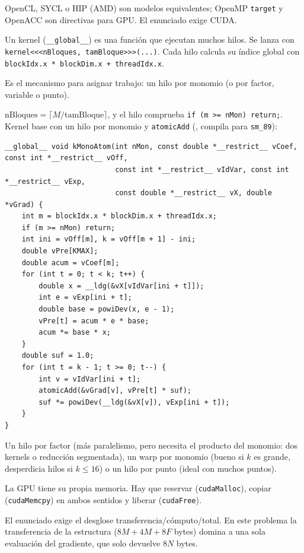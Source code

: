 \alt OpenCL, SYCL o HIP (AMD) son modelos equivalentes; OpenMP \texttt{target} y OpenACC son directivas para GPU. El enunciado exige CUDA.

\que Un kernel (\texttt{\_\_global\_\_}) es una función que ejecutan muchos hilos. Se lanza con \texttt{kernel<<<nBloques, tamBloque>>>(...)}. Cada hilo calcula su índice global con \texttt{blockIdx.x * blockDim.x + threadIdx.x}.

\porque Es el mecanismo para asignar trabajo: un hilo por monomio (o por factor, variable o punto).

\como $\text{nBloques}=\lceil M/\text{tamBloque}\rceil$, y el hilo comprueba \texttt{if (m >= nMon) return;}. Kernel base con un hilo por monomio y \texttt{atomicAdd} (, compila para \texttt{sm\_89}):
\begin{lstlisting}[language=CUDA]
__global__ void kMonoAtom(int nMon, const double *__restrict__ vCoef, const int *__restrict__ vOff,
                          const int *__restrict__ vIdVar, const int *__restrict__ vExp,
                          const double *__restrict__ vX, double *vGrad) {
    int m = blockIdx.x * blockDim.x + threadIdx.x;
    if (m >= nMon) return;
    int ini = vOff[m], k = vOff[m + 1] - ini;
    double vPre[KMAX];
    double acum = vCoef[m];
    for (int t = 0; t < k; t++) {
        double x = __ldg(&vX[vIdVar[ini + t]]);
        int e = vExp[ini + t];
        double base = powiDev(x, e - 1);
        vPre[t] = acum * e * base;
        acum *= base * x;
    }
    double suf = 1.0;
    for (int t = k - 1; t >= 0; t--) {
        int v = vIdVar[ini + t];
        atomicAdd(&vGrad[v], vPre[t] * suf);
        suf *= powiDev(__ldg(&vX[v]), vExp[ini + t]);
    }
}
\end{lstlisting}

\alt Un hilo por factor (más paralelismo, pero necesita el producto del monomio: dos kernels o reducción segmentada), un warp por monomio (bueno si $k$ es grande, desperdicia hilos si $k\le16$) o un hilo por punto (ideal con muchos puntos).

\que La GPU tiene su propia memoria. Hay que reservar (\texttt{cudaMalloc}), copiar (\texttt{cudaMemcpy}) en ambos sentidos y liberar (\texttt{cudaFree}).

\porque El enunciado exige el desglose transferencia/cómputo/total. En este problema la transferencia de la estructura ($8M+4M+8F$ bytes) domina a una sola evaluación del gradiente, que solo devuelve $8N$ bytes.

